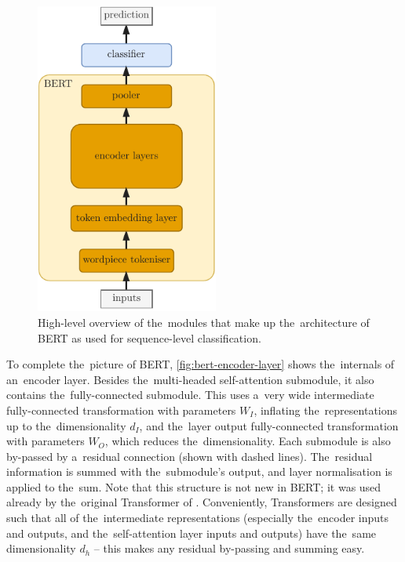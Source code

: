 \documentclass[bsc,frontabs,singlespacing,parskip,deptreport]{infthesis}
\begin{document}
{{{      \begin{figure}[h!t]
        \centering
        \includegraphics[width=6cm]{graphics/bert-hl}
        \caption{High-level overview of the~modules that make up the~architecture of BERT as used for sequence-level classification.}
        \label{fig:bert-hl}
      \end{figure}

      To complete the~picture of BERT, \autoref{fig:bert-encoder-layer} shows the~internals of an~encoder layer. Besides the~multi-headed self-attention submodule, it also contains the~fully-connected submodule. This uses a~very wide intermediate fully-connected transformation with parameters $W_I$, inflating the~representations up to the~dimensionality $d_I$, and the~layer output fully-connected transformation with parameters $W_O$, which reduces the~dimensionality. Each submodule is also by-passed by a~residual connection (shown with dashed lines). The~residual information is summed with the~submodule's output, and layer normalisation is applied to the~sum. Note that this structure is not new in BERT; it was used already by the~original Transformer of \citet{Vaswani_2017}. Conveniently, Transformers are designed such that all of the~intermediate representations (especially the~encoder inputs and outputs, and the~self-attention layer inputs and outputs) have the~same dimensionality $d_h$ -- this makes any residual by-passing and summing easy.

}}}
\end{document}
